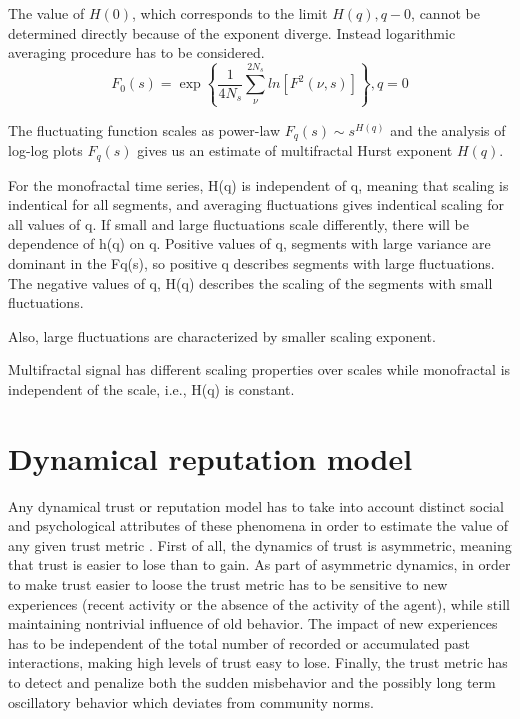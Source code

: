 The value of $H(0)$, which corresponds to the limit $H(q), q-0$, cannot be determined directly because of the exponent diverge. Instead logarithmic averaging procedure has to be considered. 
\begin{equation}
F_0(s) = \exp \left\{\frac{1}{4N_s}\sum_{\nu}^{2N_s}ln \left[F^2(\nu, s)\right]\right\}, q=0
\end{equation}

The fluctuating function scales as power-law $F_q(s) \sim s^{H(q)}$ and the analysis of log-log plots $F_q(s)$ gives us an estimate of multifractal Hurst exponent $H(q)$.

For the monofractal time series, H(q) is independent of q, meaning that scaling is indentical for all segments, and averaging fluctuations gives indentical scaling for all values of q. If small and large fluctuations scale differently, there will be dependence of h(q) on q. Positive values of q, segments with large variance are dominant in the Fq(s), so positive q describes segments with large fluctuations. The negative values of q, H(q) describes the scaling of the segments with small fluctuations. 

Also, large fluctuations are characterized by smaller scaling exponent. 

Multifractal signal has different scaling properties over scales while monofractal is independent of the scale, i.e., H(q) is constant. 

\section{Dynamical reputation model}

Any dynamical trust or reputation model has to take into account distinct social and psychological attributes of these phenomena in order to estimate the value of any given trust metric \cite{duma2005dynamic}. First of all, the dynamics of trust is asymmetric, meaning that trust is easier to lose than to gain. As part of asymmetric dynamics, in order to make trust easier to loose the trust metric has to be sensitive to new experiences (recent activity or the absence of the activity of the agent), while still maintaining nontrivial influence of old behavior. The impact of new experiences has to be independent of
the total number of recorded or accumulated past interactions, making high levels of trust easy to lose. 
Finally, the trust metric has to detect and penalize both the sudden misbehavior and the possibly long term oscillatory behavior which deviates from community norms.

